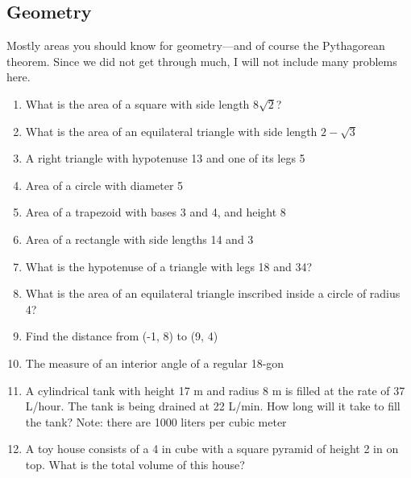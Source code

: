 			\subsection{Geometry}
		Mostly areas you should know for geometry---and of course the Pythagorean theorem. Since we did not get through much, I will not include many problems here.
		\begin{enumerate}
			\item What is the area of a square with side length $8\sqrt{2}$?
			\item What is the area of an equilateral triangle with side length $2-\sqrt{3}$
			\item A right triangle with hypotenuse 13 and one of its legs 5
			\item Area of a circle with diameter 5
			\item Area of a trapezoid with bases 3 and 4, and height 8
			\item Area of a rectangle with side lengths 14 and 3
			\item What is the hypotenuse of a triangle with legs 18 and 34?
			\item What is the area of an equilateral triangle inscribed inside a circle of radius 4?
			\item Find the distance from (-1, 8) to (9, 4)
			\item The measure of an interior angle of a regular 18-gon
			\item A cylindrical tank with height 17 m and radius 8 m is filled at the rate of 37 L/hour. The tank is being drained at 22 L/min. How long will it take to fill the tank? Note: there are 1000 liters per cubic meter
			\item A toy house consists of a 4 in cube with a square pyramid of height 2 in on top. What is the total volume of this house?
		\end{enumerate}